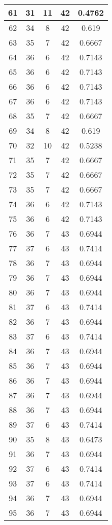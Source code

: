 \documentclass[letterpaper, 12pt]{article}
\begin{document}
\begin{longtable}{|c|c|c|c|c|}
61 & 31 & 11 & 42 & 0.4762 \\
\hline
62 & 34 & 8 & 42 & 0.619 \\
\hline
63 & 35 & 7 & 42 & 0.6667 \\
\hline
64 & 36 & 6 & 42 & 0.7143 \\
\hline
65 & 36 & 6 & 42 & 0.7143 \\
\hline
66 & 36 & 6 & 42 & 0.7143 \\
\hline
67 & 36 & 6 & 42 & 0.7143 \\
\hline
68 & 35 & 7 & 42 & 0.6667 \\
\hline
69 & 34 & 8 & 42 & 0.619 \\
\hline
70 & 32 & 10 & 42 & 0.5238 \\
\hline
71 & 35 & 7 & 42 & 0.6667 \\
\hline
72 & 35 & 7 & 42 & 0.6667 \\
\hline
73 & 35 & 7 & 42 & 0.6667 \\
\hline
74 & 36 & 6 & 42 & 0.7143 \\
\hline
75 & 36 & 6 & 42 & 0.7143 \\
\hline
76 & 36 & 7 & 43 & 0.6944 \\
\hline
77 & 37 & 6 & 43 & 0.7414 \\
\hline
78 & 36 & 7 & 43 & 0.6944 \\
\hline
79 & 36 & 7 & 43 & 0.6944 \\
\hline
80 & 36 & 7 & 43 & 0.6944 \\
\hline
81 & 37 & 6 & 43 & 0.7414 \\
\hline
82 & 36 & 7 & 43 & 0.6944 \\
\hline
83 & 37 & 6 & 43 & 0.7414 \\
\hline
84 & 36 & 7 & 43 & 0.6944 \\
\hline
85 & 36 & 7 & 43 & 0.6944 \\
\hline
86 & 36 & 7 & 43 & 0.6944 \\
\hline
87 & 36 & 7 & 43 & 0.6944 \\
\hline
88 & 36 & 7 & 43 & 0.6944 \\
\hline
89 & 37 & 6 & 43 & 0.7414 \\
\hline
90 & 35 & 8 & 43 & 0.6473 \\
\hline
91 & 36 & 7 & 43 & 0.6944 \\
\hline
92 & 37 & 6 & 43 & 0.7414 \\
\hline
93 & 37 & 6 & 43 & 0.7414 \\
\hline
94 & 36 & 7 & 43 & 0.6944 \\
\hline
95 & 36 & 7 & 43 & 0.6944 \\

\end{longtable}
\end{document}
